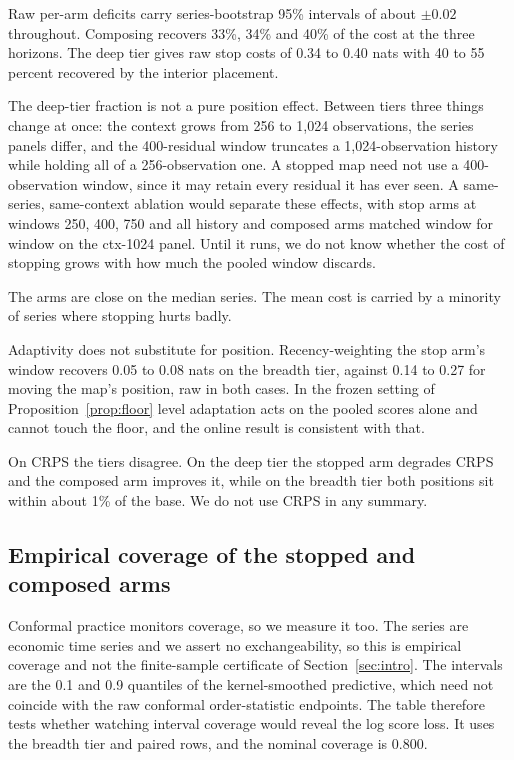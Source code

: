 \documentclass[11pt]{article}
\theoremstyle{remark}
\begin{document}
Raw per-arm deficits carry series-bootstrap 95\% intervals of about $\pm 0.02$
throughout. Composing recovers 33\%, 34\% and 40\% of the cost at the three
horizons. The deep tier gives raw stop
costs of 0.34 to 0.40 nats with 40 to 55 percent recovered by the interior
placement.

The deep-tier fraction is not a pure position effect. Between tiers three things
change at once: the context grows from 256 to 1{,}024 observations, the series
panels differ, and the 400-residual window truncates a 1{,}024-observation history
while holding all of a 256-observation one. A stopped map need not use a
400-observation window, since it may retain every residual it has ever seen. A
same-series, same-context ablation would separate these effects, with stop arms at
windows 250, 400, 750 and all history and composed arms matched window for window
on the ctx-1024 panel. Until it runs, we do not know whether the cost of stopping
grows with how much the pooled window discards.

The arms are close on the median series. The mean cost is carried by a
minority of series where stopping hurts badly.

Adaptivity does not substitute for position. Recency-weighting the stop arm's
window recovers 0.05 to 0.08 nats on the breadth tier, against 0.14 to 0.27
for moving the map's position, raw in both cases. In the frozen setting of
Proposition~\ref{prop:floor} level adaptation acts on the pooled scores alone and cannot
touch the floor, and the online result is consistent with that.

On CRPS the tiers disagree. On the deep tier the stopped arm degrades CRPS and
the composed arm improves it, while on the breadth tier both positions sit within
about 1\% of the base. We do not use CRPS in any summary.

\subsection{Empirical coverage of the stopped and composed arms}\label{sec:blind}

Conformal practice monitors coverage, so we measure it too. The series are
economic time series and we assert no exchangeability, so this is empirical
coverage and not the finite-sample certificate of Section~\ref{sec:intro}. The
intervals are the 0.1 and 0.9 quantiles of the kernel-smoothed predictive, which
need not coincide with the raw conformal order-statistic endpoints. The table
therefore tests whether watching interval coverage would reveal the log score loss.
It uses the breadth tier and paired rows, and the nominal coverage is 0.800.
\end{document}
